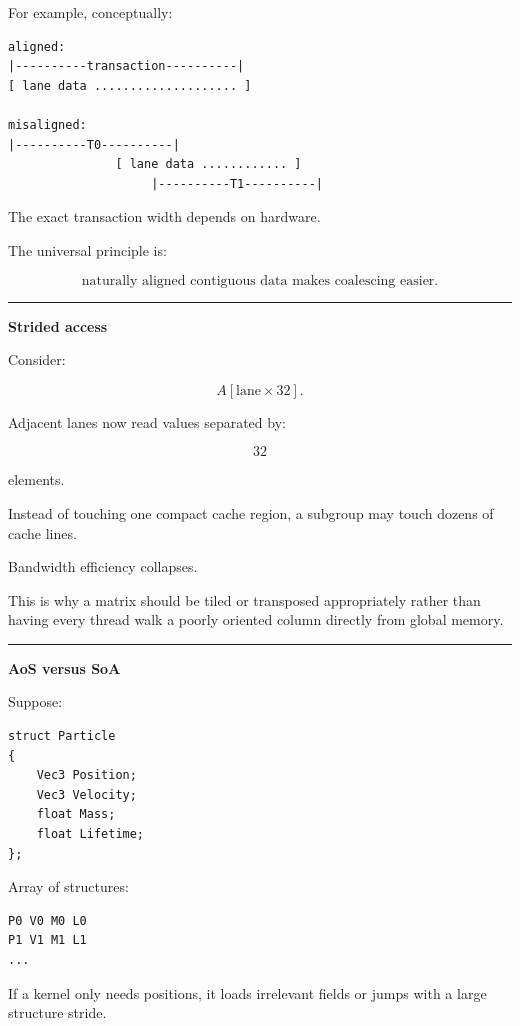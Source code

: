 For example, conceptually:

\protect{}\label{yfpnbu}%
\begin{verbatim}
aligned:
|----------transaction----------|
[ lane data .................... ]

misaligned:
|----------T0----------|
               [ lane data ............ ]
                    |----------T1----------|
\end{verbatim}

The exact transaction width depends on hardware.

The universal principle is:

\[
\boxed{
\text{naturally aligned contiguous data makes coalescing easier}.
}
\]

\begin{center}\rule{0.5\linewidth}{0.5pt}\end{center}

\textbf{Strided access}

Consider:

\[
A[\text{lane}\times32].
\]

Adjacent lanes now read values separated by:

\[
32
\]

elements.

Instead of touching one compact cache region, a subgroup may touch dozens of cache lines.

Bandwidth efficiency collapses.

This is why a matrix should be tiled or transposed appropriately rather than having every thread walk a poorly oriented column directly from global memory.

\begin{center}\rule{0.5\linewidth}{0.5pt}\end{center}

\textbf{AoS versus SoA}

Suppose:

\protect{}\label{4azajn}%
\begin{verbatim}
struct Particle
{
    Vec3 Position;
    Vec3 Velocity;
    float Mass;
    float Lifetime;
};
\end{verbatim}

Array of structures:

\protect{}\label{9euomv}%
\begin{verbatim}
P0 V0 M0 L0
P1 V1 M1 L1
...
\end{verbatim}

If a kernel only needs positions, it loads irrelevant fields or jumps with a large structure stride.

